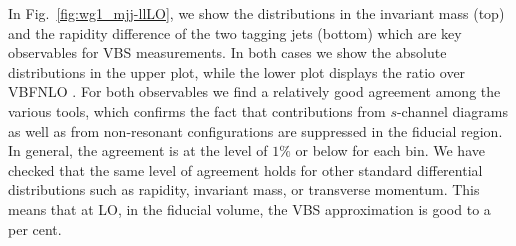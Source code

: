 In Fig.~\ref{fig:wg1_mjj-llLO}, we show the distributions in the invariant mass (top) and the rapidity difference of the two tagging jets (bottom) which are key observables for VBS measurements.
In both cases we show the absolute distributions in the upper plot, while the lower plot displays the ratio over {\sc VBFNLO} .
For both observables we find a relatively good agreement among the various tools, which confirms the fact that contributions from $s$-channel diagrams as well as from non-resonant configurations are suppressed in the fiducial region.
In general, the agreement is at the level of $1\%$ or below for each bin.
We have checked that the same level of agreement holds for other standard differential distributions such as rapidity, invariant mass, or transverse momentum.
This means that at LO, in the fiducial volume, the VBS approximation is good to a per cent.

